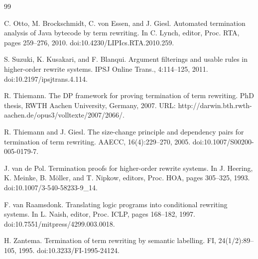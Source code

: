\documentclass[10pt,a4paper]{amsart}
\begin{document}
\begin{thebibliography}{99}
\par\noindent  [39]  C. Otto, M. Brockschmidt, C. von Essen, and J. Giesl.  Automated termination analysis of Java bytecode by term rewriting.  In C. Lynch, editor, Proc. RTA, pages 259–276, 2010.  doi:10.4230/LIPIcs.RTA.2010.259.  
 
\par\noindent  [40]  S. Suzuki, K. Kusakari, and F. Blanqui.  Argument filterings and usable rules in higher-order rewrite systems.  IPSJ Online Trans., 4:114–125, 2011.  doi:10.2197/ipsjtrans.4.114.  
 
\par\noindent  [41]  R. Thiemann.  The DP framework for proving termination of term rewriting.  PhD thesis, RWTH Aachen University, Germany, 2007.  URL: http://darwin.bth.rwth-aachen.de/opus3/volltexte/2007/2066/.  
 
\par\noindent  [42]  R. Thiemann and J. Giesl.  The size-change principle and dependency pairs for termination of term rewriting.  AAECC, 16(4):229–270, 2005.  doi:10.1007/S00200-005-0179-7.  
 
\par\noindent  [43]  J. van de Pol.  Termination proofs for higher-order rewrite systems.  In J. Heering, K. Meinke, B. Möller, and T. Nipkow, editors, Proc. HOA, pages 305–325, 1993.  doi:10.1007/3-540-58233-9\_14.  
 
\par\noindent  [44]  F. van Raamsdonk.  Translating logic programs into conditional rewriting systems.  In L. Naish, editor, Proc. ICLP, pages 168–182, 1997.  doi:10.7551/mitpress/4299.003.0018.  
 
\par\noindent  [45]  H. Zantema.  Termination of term rewriting by semantic labelling.  FI, 24(1/2):89–105, 1995.  doi:10.3233/FI-1995-24124.  
  
\end{thebibliography}
\end{document}
